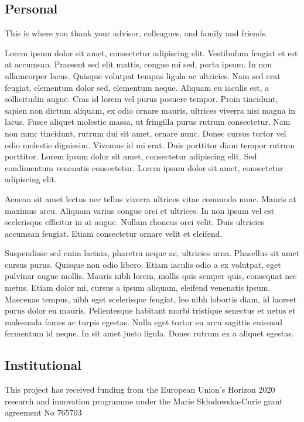 \subsection*{Personal}

This is where you thank your advisor, colleagues, and family and friends.

Lorem ipsum dolor sit amet, consectetur adipiscing elit. Vestibulum feugiat et est at accumsan. Praesent sed elit mattis, congue mi sed, porta ipsum. In non ullamcorper lacus. Quisque volutpat tempus ligula ac ultricies. Nam sed erat feugiat, elementum dolor sed, elementum neque. Aliquam eu iaculis est, a sollicitudin augue. Cras id lorem vel purus posuere tempor. Proin tincidunt, sapien non dictum aliquam, ex odio ornare mauris, ultrices viverra nisi magna in lacus. Fusce aliquet molestie massa, ut fringilla purus rutrum consectetur. Nam non nunc tincidunt, rutrum dui sit amet, ornare nunc. Donec cursus tortor vel odio molestie dignissim. Vivamus id mi erat. Duis porttitor diam tempor rutrum porttitor. Lorem ipsum dolor sit amet, consectetur adipiscing elit. Sed condimentum venenatis consectetur. Lorem ipsum dolor sit amet, consectetur adipiscing elit.

Aenean sit amet lectus nec tellus viverra ultrices vitae commodo nunc. Mauris at maximus arcu. Aliquam varius congue orci et ultrices. In non ipsum vel est scelerisque efficitur in at augue. Nullam rhoncus orci velit. Duis ultricies accumsan feugiat. Etiam consectetur ornare velit et eleifend.

Suspendisse sed enim lacinia, pharetra neque ac, ultricies urna. Phasellus sit amet cursus purus. Quisque non odio libero. Etiam iaculis odio a ex volutpat, eget pulvinar augue mollis. Mauris nibh lorem, mollis quis semper quis, consequat nec metus. Etiam dolor mi, cursus a ipsum aliquam, eleifend venenatis ipsum. Maecenas tempus, nibh eget scelerisque feugiat, leo nibh lobortis diam, id laoreet purus dolor eu mauris. Pellentesque habitant morbi tristique senectus et netus et malesuada fames ac turpis egestas. Nulla eget tortor eu arcu sagittis euismod fermentum id neque. In sit amet justo ligula. Donec rutrum ex a aliquet egestas.

\subsection*{Institutional}

This project has received funding from the European Union’s Horizon 2020 research and innovation programme under the Marie Skłodowska-Curie grant agreement No 765703

